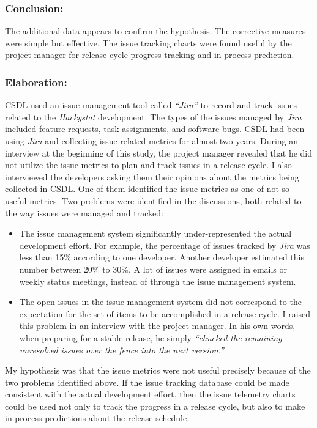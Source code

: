\subsubsection{Conclusion:}
The additional data appears to confirm the hypothesis. The corrective measures were simple but effective. The issue tracking charts were found useful by the project manager for release cycle progress tracking and in-process prediction.

\subsubsection{Elaboration:}

CSDL used an issue management tool called \textit{``Jira''} to record and track issues related to the \textit{Hackystat} development. The types of the issues managed by \textit{Jira} included feature requests, task assignments, and software bugs. CSDL had been using \textit{Jira} and collecting issue related metrics for almost two years.
During an interview at the beginning of this study, the project manager revealed that he did not utilize the issue metrics to plan and track issues in a release cycle. I also interviewed the developers asking them their opinions about the metrics being collected in CSDL. One of them identified the issue metrics as one of not-so-useful metrics. Two problems were identified in the discussions, both related to the way issues were managed and tracked:

\begin{itemize}
  \item The issue management system significantly under-represented the actual development effort. For example, the percentage of issues tracked by \textit{Jira} was less than 15\% according to one developer. Another developer estimated this number between 20\% to 30\%. A lot of issues were assigned in emails or weekly status meetings, instead of through the issue management system.
  
	\item The open issues in the issue management system did not correspond to the expectation for the set of items to be accomplished in a release cycle. I raised this problem in an interview with the project manager. In his own words, when preparing for a stable release, he simply \textit{``chucked the remaining unresolved issues over the fence into the next version.''}
\end{itemize}

My hypothesis was that the issue metrics were not useful precisely because of the two problems identified above. If the issue tracking database could be made consistent with the actual development effort, then the issue telemetry charts could be used not only to track the progress in a release cycle, but also to make in-process predictions about the release schedule.

